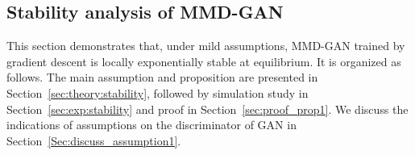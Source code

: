 \documentclass{article} %
\theoremstyle{plain}
\newtheorem*{proposition 1*}{Proposition 1}
\begin{document}
\clearpage
\begin{appendices}

\setcounter{equation}{0}
\setcounter{figure}{0}
\setcounter{table}{0}
\renewcommand{\theequation}{S\arabic{equation}}
\renewcommand{\thefigure}{S\arabic{figure}}
\renewcommand{\thetable}{S\arabic{table}}

\section{Stability analysis of MMD-GAN}
\label{sec:gan_stable}

This section demonstrates that, under mild assumptions, MMD-GAN trained by gradient descent is locally exponentially stable at equilibrium. It is organized as follows. The main assumption and proposition are presented in Section~\ref{sec:theory:stability}, followed by simulation study in Section~\ref{sec:exp:stability} and proof in Section~\ref{sec:proof_prop1}. We discuss the indications of assumptions on the discriminator of GAN in Section~\ref{Sec:discuss_assumption1}.


\end{appendices}
\end{document}
